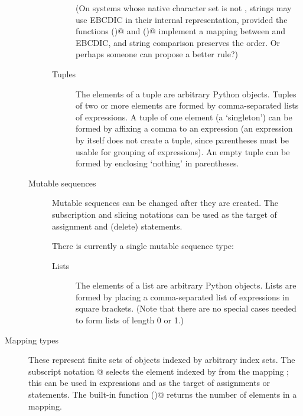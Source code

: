 \begin{description}
\begin{description}
\begin{description}
(On systems whose native character set is not \ASCII{}, strings may use
EBCDIC in their internal representation, provided the functions
\verb@chr()@ and \verb@ord()@ implement a mapping between \ASCII{} and
EBCDIC, and string comparison preserves the \ASCII{} order.
Or perhaps someone can propose a better rule?)

\item[Tuples]
The elements of a tuple are arbitrary Python objects.
Tuples of two or more elements are formed by comma-separated lists
of expressions.  A tuple of one element (a `singleton') can be formed
by affixing a comma to an expression (an expression by itself does
not create a tuple, since parentheses must be usable for grouping of
expressions).  An empty tuple can be formed by enclosing `nothing' in
parentheses.

\end{description} %

\item[Mutable sequences]
Mutable sequences can be changed after they are created.  The
subscription and slicing notations can be used as the target of
assignment and \verb@del@ (delete) statements.

There is currently a single mutable sequence type:

\begin{description}

\item[Lists]
The elements of a list are arbitrary Python objects.  Lists are formed
by placing a comma-separated list of expressions in square brackets.
(Note that there are no special cases needed to form lists of length 0
or 1.)

\end{description} %

\end{description} %

\item[Mapping types]
These represent finite sets of objects indexed by arbitrary index sets.
The subscript notation \verb@a[k]@ selects the element indexed
by \verb@k@ from the mapping \verb@a@; this can be used in
expressions and as the target of assignments or \verb@del@ statements.
The built-in function \verb@len()@ returns the number of elements
in a mapping.


\end{description}
